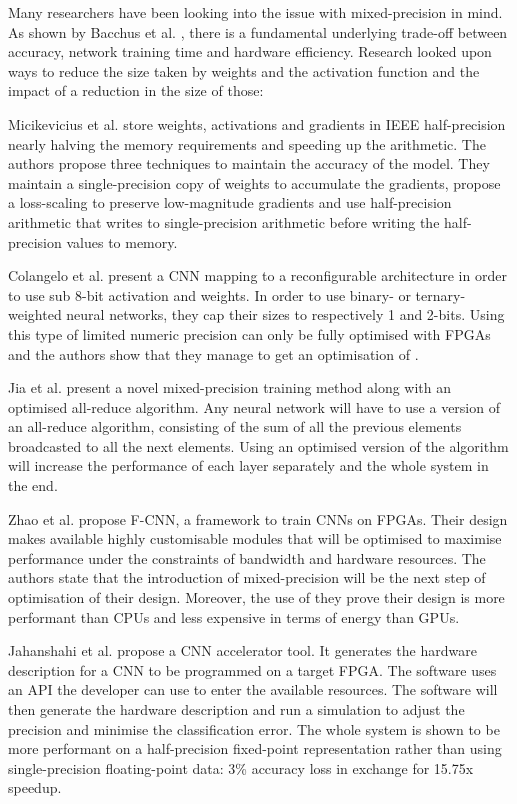 Many researchers have been looking into the issue with mixed-precision in mind. As shown by Bacchus et al. \cite{Bacchus2020}, there is a fundamental underlying trade-off between accuracy, network training time and hardware efficiency. Research looked upon ways to reduce the size taken by weights and the activation function and the impact of a reduction in the size of those:

Micikevicius et al. \cite{Micikevicius2017} store weights, activations and gradients in IEEE half-precision nearly halving the memory requirements and speeding up the arithmetic. The authors propose three techniques to maintain the accuracy of the model. They maintain a single-precision copy of weights to accumulate the gradients, propose a loss-scaling to preserve low-magnitude gradients and use half-precision arithmetic that writes to single-precision arithmetic before writing the half-precision values to memory.

Colangelo et al. \cite{Colangelo2018} present a CNN mapping to a reconfigurable architecture in order to use sub 8-bit activation and weights. In order to use binary- or ternary-weighted neural networks, they cap their sizes to respectively 1 and 2-bits. Using this type of limited numeric precision can only be fully optimised with FPGAs and the authors show that they manage to get an optimisation of .

Jia et al. \cite{Jia2018} present a novel mixed-precision training method along with an optimised all-reduce algorithm. Any neural network will have to use a version of an all-reduce algorithm, consisting of the sum of all the previous elements broadcasted to all the next elements. Using an optimised version of the algorithm will increase the performance of each layer separately and the whole system in the end.

Zhao et al. \cite{Zhao2016} propose F-CNN, a framework to train CNNs on FPGAs. Their design makes available highly customisable modules that will be optimised to maximise performance under the constraints of bandwidth and hardware resources. The authors state that the introduction of mixed-precision will be the next step of optimisation of their design. Moreover, the use of they prove their design is more performant than CPUs and less expensive in terms of energy than GPUs.

Jahanshahi et al. \cite{Jahanshahi2019} propose a CNN accelerator tool. It generates the hardware description for a CNN to be programmed on a target FPGA. The software uses an API the developer can use to enter the available resources. The software will then generate the hardware description and run a simulation to adjust the precision and minimise the classification error. The whole system is shown to be more performant on a half-precision fixed-point representation rather than using single-precision floating-point data: 3\% accuracy loss in exchange for 15.75x speedup.

